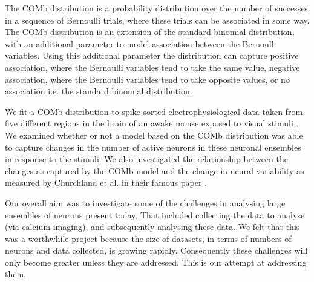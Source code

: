 The COMb distribution is a probability distribution over the number of successes in a sequence of Bernoulli trials, where these trials can be associated in some way. The COMb distribution is an extension of the standard binomial distribution, with an additional parameter to model association between the Bernoulli variables. Using this additional parameter the distribution can capture positive association, where the Bernoulli variables tend to take the same value, negative association, where the Bernoulli variables tend to take opposite values, or no association i.e. the standard binomial distribution.

We fit a COMb distribution to spike sorted electrophysiological data taken from five different regions in the brain of an awake mouse exposed to visual stimuli \cite{steinmetz2019}. We examined whether or not a model based on the COMb distribution was able to capture changes in the number of active neurons in these neuronal ensembles in response to the stimuli. We also investigated the relationship between the changes as captured by the COMb model and the change in neural variability as measured by Churchland et al. in their famous paper \parencite{Churchland}.

Our overall aim was to investigate some of the challenges in analysing large ensembles of neurons present today. That included collecting the data to analyse (via calcium imaging), and subsequently analysing these data. We felt that this was a worthwhile project because the size of datasets, in terms of numbers of neurons and data collected, is growing rapidly. Consequently these challenges will only become greater unless they are addressed. This is our attempt at addressing them.
